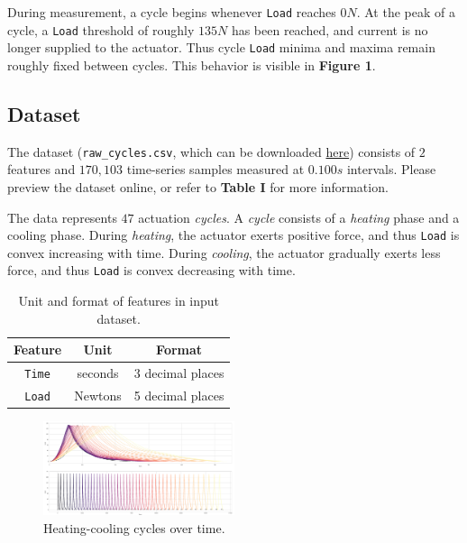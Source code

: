 \documentclass[letterpaper, 10 pt, conference]{ieeeconf}  %
\begin{document}
During measurement, a cycle begins whenever \verb|Load| reaches $0N$. At the peak of a cycle, a \verb|Load| threshold of roughly $135N$ has been reached, and current is no longer supplied to the actuator. Thus cycle \verb|Load| minima and maxima remain roughly fixed between cycles. This behavior is visible in \textbf{Figure 1}.%

\subsection{Dataset}

The dataset (\verb|raw_cycles.csv|, which can be downloaded \href{https://github.com/Columbia-Creative-Machines-Lab/muscle-prediction}{here}) consists of $2$ features and $170,103$ time-series samples measured at $0.100s$ intervals. Please preview the dataset online, or refer to \textbf{Table I} for more information. %

The data represents $47$ actuation \textit{cycles}. A \textit{cycle} consists of a \textit{heating} phase and a cooling phase. During \textit{heating}, the actuator exerts positive force, and thus \verb|Load| is convex increasing with time. During \textit{cooling}, the actuator gradually exerts less force, and thus \verb|Load| is convex decreasing with time. 

\begin{table}[h] %
  \centering
  \begin{tabular}{ c | c c }
      Feature & Unit & Format \\
      \hline
      \verb|Time| & seconds & 3 decimal places \\
      \verb|Load| & Newtons & 5 decimal places
  \end{tabular}
  \label{Dataset}
  \caption{Unit and format of features in input dataset.}
\end{table}

\label{CyclesOverlaid}
\begin{figure}[h]
	\centering
	\includegraphics[width=0.5\textwidth]{assets/cyclesoverlaid.png}
    \caption{Heating-cooling cycles over time.}
\end{figure}
\end{document}
